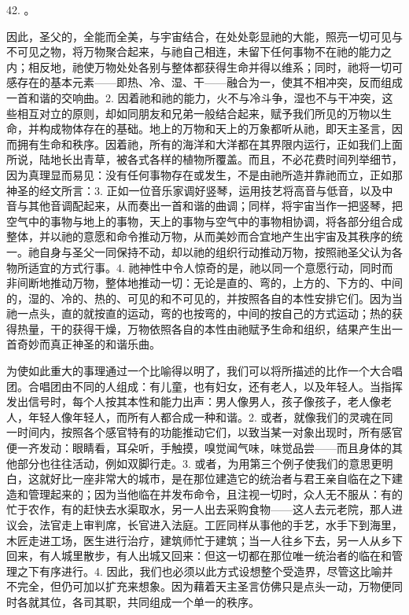 42. 。\par

因此，圣父的，全能而全美，与宇宙结合，在处处彰显祂的大能，照亮一切可见与不可见之物，将万物聚合起来，与祂自己相连，未留下任何事物不在祂的能力之内；相反地，祂使万物处处各别与整体都获得生命并得以维系；同时，祂将一切可感存在的基本元素——即热、冷、湿、干——融合为一，使其不相冲突，反而组成一首和谐的交响曲。2. 因着祂和祂的能力，火不与冷斗争，湿也不与干冲突，这些相互对立的原则，却如同朋友和兄弟一般结合起来，赋予我们所见的万物以生命，并构成物体存在的基础。地上的万物和天上的万象都听从祂，即天主圣言，因而拥有生命和秩序。因着祂，所有的海洋和大洋都在其界限内运行，正如我们上面所说，陆地长出青草，被各式各样的植物所覆盖。而且，不必花费时间列举细节，因为真理显而易见：没有任何事物存在或发生，不是由祂所造并靠祂而立，正如那神圣的经文所言：3. 正如一位音乐家调好竖琴，运用技艺将高音与低音，以及中音与其他音调配起来，从而奏出一首和谐的曲调；同样，将宇宙当作一把竖琴，把空气中的事物与地上的事物，天上的事物与空气中的事物相协调，将各部分组合成整体，并以祂的意愿和命令推动万物，从而美妙而合宜地产生出宇宙及其秩序的统一。祂自身与圣父一同保持不动，却以祂的组织行动推动万物，按照祂圣父认为各物所适宜的方式行事。4. 祂神性中令人惊奇的是，祂以同一个意愿行动，同时而非间断地推动万物，整体地推动一切：无论是直的、弯的，上方的、下方的、中间的，湿的、冷的、热的、可见的和不可见的，并按照各自的本性安排它们。因为当祂一点头，直的就按直的运动，弯的也按弯的，中间的按自己的方式运动；热的获得热量，干的获得干燥，万物依照各自的本性由祂赋予生命和组织，结果产生出一首奇妙而真正神圣的和谐乐曲。\par

\par

为使如此重大的事理通过一个比喻得以明了，我们可以将所描述的比作一个大合唱团。合唱团由不同的人组成：有儿童，也有妇女，还有老人，以及年轻人。当指挥发出信号时，每个人按其本性和能力出声：男人像男人，孩子像孩子，老人像老人，年轻人像年轻人，而所有人都合成一种和谐。2. 或者，就像我们的灵魂在同一时间内，按照各个感官特有的功能推动它们，以致当某一对象出现时，所有感官便一齐发动：眼睛看，耳朵听，手触摸，嗅觉闻气味，味觉品尝——而且身体的其他部分也往往活动，例如双脚行走。3. 或者，为用第三个例子使我们的意思更明白，这就好比一座非常大的城市，是在那位建造它的统治者与君王亲自临在之下建造和管理起来的；因为当他临在并发布命令，且注视一切时，众人无不服从：有的忙于农作，有的赶快去水渠取水，另一人出去采购食物——这人去元老院，那人进议会，法官走上审判席，长官进入法庭。工匠同样从事他的手艺，水手下到海里，木匠走进工场，医生进行治疗，建筑师忙于建筑；当一人往乡下去，另一人从乡下回来，有人城里散步，有人出城又回来：但这一切都在那位唯一统治者的临在和管理之下有序进行。4. 因此，我们也必须以此方式设想整个受造界，尽管这比喻并不完全，但仍可加以扩充来想象。因为藉着天主圣言仿佛只是点头一动，万物便同时各就其位，各司其职，共同组成一个单一的秩序。\par

